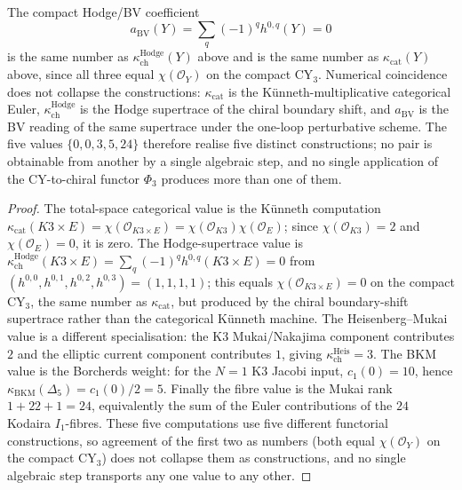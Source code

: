 \begin{theorem}
The compact Hodge/BV coefficient
\[
a_{\mathrm{BV}}(Y)=\sum_q(-1)^qh^{0,q}(Y)=0
\]
is the same number as $\kappa_{\mathrm{ch}}^{\mathrm{Hodge}}(Y)$ above and is the same number as $\kappa_{\mathrm{cat}}(Y)$ above, since all three equal $\chi(\mathcal{O}_Y)$ on the compact CY$_3$. Numerical coincidence does not collapse the constructions: $\kappa_{\mathrm{cat}}$ is the K\"unneth-multiplicative categorical Euler, $\kappa_{\mathrm{ch}}^{\mathrm{Hodge}}$ is the Hodge supertrace of the chiral boundary shift, and $a_{\mathrm{BV}}$ is the BV reading of the same supertrace under the one-loop perturbative scheme. The five values $\{0, 0, 3, 5, 24\}$ therefore realise five distinct constructions; no pair is obtainable from another by a single algebraic step, and no single application of the CY-to-chiral functor $\Phi_3$ produces more than one of them.
\end{theorem}

\begin{proof}
The total-space categorical value is the K\"unneth computation
\(\kappa_{\mathrm{cat}}(K3\times E) = \chi(\mathcal O_{K3\times E})=\chi(\mathcal O_{K3})\chi(\mathcal O_E)\);
since \(\chi(\mathcal O_{K3})=2\) and \(\chi(\mathcal O_E)=0\), it is
zero. The Hodge-supertrace value is
\(\kappa_{\mathrm{ch}}^{\mathrm{Hodge}}(K3 \times E) = \sum_q (-1)^q h^{0, q}(K3 \times E) = 0\)
from \((h^{0,0},h^{0,1},h^{0,2},h^{0,3})=(1,1,1,1)\); this equals
\(\chi(\mathcal{O}_{K3 \times E}) = 0\) on the compact CY$_3$, the same
number as \(\kappa_{\mathrm{cat}}\), but produced by the chiral
boundary-shift supertrace rather than the categorical K\"unneth machine.
The Heisenberg--Mukai value is a different specialisation: the K3
Mukai/Nakajima component contributes \(2\) and the elliptic current
component contributes \(1\), giving
\(\kappa_{\mathrm{ch}}^{\mathrm{Heis}}=3\). The BKM value is the
Borcherds weight: for the \(N=1\) K3 Jacobi input,
\(c_1(0)=10\), hence
\(\kappa_{\mathrm{BKM}}(\Delta_5)=c_1(0)/2=5\). Finally the fibre value is the
Mukai rank \(1+22+1=24\), equivalently the sum of the Euler
contributions of the \(24\) Kodaira \(I_1\)-fibres. These five
computations use five different functorial constructions, so
agreement of the first two as numbers (both equal $\chi(\mathcal{O}_Y)$
on the compact CY$_3$) does not collapse them as constructions, and
no single algebraic step transports any one value to any other.
\end{proof}

